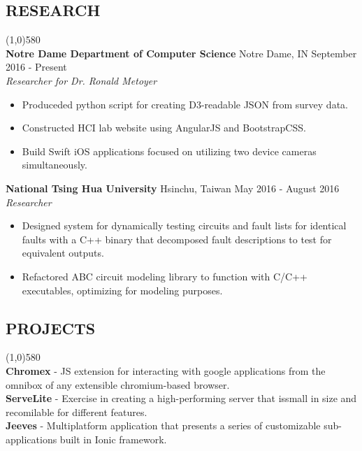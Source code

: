 \documentclass[10pt]{article}
\begin{document}
  \vspace{-8pt}
  \subsection*{\fontsize{10}{-10}\selectfont RESEARCH}
    \vspace{-16pt}
    \line(1,0){580}\\
    \textbf{Notre Dame Department of Computer Science}
    \tab
    Notre Dame, IN
    \hfill
    September 2016 - Present
    \\
    \textit{Researcher for Dr. Ronald Metoyer}
    \begin{itemize}
      \item Produceded python script for creating D3-readable JSON from survey data.
      \item Constructed HCI lab website using AngularJS and BootstrapCSS.
      \item Build Swift iOS applications focused on utilizing two device cameras simultaneously.
    \end{itemize}

    \textbf{National Tsing Hua University}
    \tab
    Hsinchu, Taiwan
    \hfill
    May 2016 - August 2016
    \\
    \textit{Researcher}
    \begin{itemize}
      \item Designed system for dynamically testing circuits and fault lists for identical faults with a C++ binary that decomposed fault descriptions to test for equivalent outputs.
      \item Refactored ABC circuit modeling library to function with C/C++ executables, optimizing for modeling purposes.
    \end{itemize}
    
  \vspace{-8pt}
  \subsection*{\fontsize{10}{-10}\selectfont PROJECTS}
    \vspace{-16pt}
    \line(1,0){580}\\
    \textbf{Chromex} - JS extension for interacting with google applications from the omnibox of any extensible chromium-based browser.
    \\
    \textbf{ServeLite} - Exercise in creating a high-performing server that issmall in size and recomilable for different features.
    \\
    \textbf{Jeeves} - Multiplatform application that presents a series of customizable sub-applications built in Ionic framework.
\end{document}
